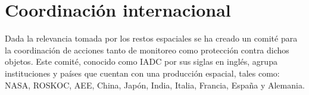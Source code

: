 \section*{Coordinación internacional} \label{sec:coordinacion}

Dada la relevancia tomada por los restos espaciales se ha creado un comité para la coordinación de acciones tanto de monitoreo como protección contra dichos objetos.
Este comité, conocido como IADC por sus siglas en inglés, agrupa instituciones y países que cuentan con una producción espacial, tales como: NASA, ROSKOC, AEE, China, Japón, India, Italia, Francia, España y Alemania.

